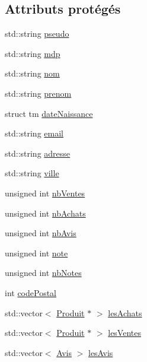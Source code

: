 \subsection*{Attributs protégés}
\begin{DoxyCompactItemize}
\item 
std\-::string \hyperlink{class_utilisateur_acefb31a3f7e204657236a73770e4b36c}{pseudo}
\item 
std\-::string \hyperlink{class_utilisateur_a49dcd340777b84cfd397c1249e7521d5}{mdp}
\item 
std\-::string \hyperlink{class_utilisateur_a04d1879dcf1e157f8606cc97b44b0cf6}{nom}
\item 
std\-::string \hyperlink{class_utilisateur_a7cbd4b405cdff4fed665d74ddca1a61f}{prenom}
\item 
struct tm \hyperlink{class_utilisateur_a1e39a6fceaafa481ff806f6aca19965c}{date\-Naissance}
\item 
std\-::string \hyperlink{class_utilisateur_ac8b4c8a7164bcd8d2d342d976ea27c56}{email}
\item 
std\-::string \hyperlink{class_utilisateur_a6a969b59bb72c45ab1022f9b231cd7ad}{adresse}
\item 
std\-::string \hyperlink{class_utilisateur_ad5a26fdf60b16be6d077aecd582edaab}{ville}
\item 
unsigned int \hyperlink{class_utilisateur_a8413b98e8caf03d4060d24f09adff967}{nb\-Ventes}
\item 
unsigned int \hyperlink{class_utilisateur_a12f9c472690ddfe7a17a2dee00eab0e6}{nb\-Achats}
\item 
unsigned int \hyperlink{class_utilisateur_a0b6f703af0a667e2b90dc71025e9c830}{nb\-Avis}
\item 
unsigned int \hyperlink{class_utilisateur_a451a871639deff66e5d32542edad615e}{note}
\item 
unsigned int \hyperlink{class_utilisateur_a3efa7d3004dcd24137e062465154c05c}{nb\-Notes}
\item 
int \hyperlink{class_utilisateur_aeff227b441e9a3b159e6718d027d9479}{code\-Postal}
\item 
std\-::vector$<$ \hyperlink{class_produit}{Produit} $\ast$ $>$ \hyperlink{class_utilisateur_a7cdc5e73be88d64fd1bc15bd8df9746f}{les\-Achats}
\item 
std\-::vector$<$ \hyperlink{class_produit}{Produit} $\ast$ $>$ \hyperlink{class_utilisateur_a27e40b56beed1756aebce85196bea0a7}{les\-Ventes}
\item 
std\-::vector$<$ \hyperlink{class_avis}{Avis} $>$ \hyperlink{class_utilisateur_acbe89c0fc475ee566102c6054fe2037d}{les\-Avis}
\end{DoxyCompactItemize}


